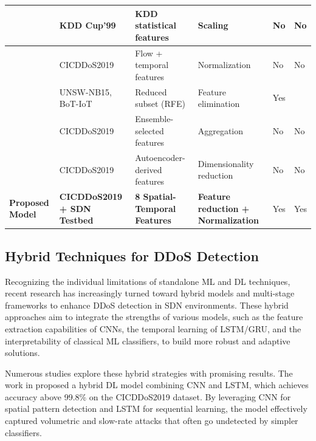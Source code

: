 \documentclass[ASNA,twocolumn]{USG} %
\providecommand{\cmark}{\ding{51}}%
\begin{document}
\begin{table}[htb!]
\begin{tabular}{|p{2.2cm}|p{3.1cm}|p{3.5cm}|p{3.6cm}|p{1cm}|p{1cm}|}
\cite{habib2024time} & KDD Cup’99 & KDD statistical features & Scaling & No & No \\
\hline

\cite{xu2025deep} & CICDDoS2019 & Flow + temporal features & Normalization & No & No \\
\hline

\cite{ain2025securing} & UNSW-NB15, BoT-IoT & Reduced subset (RFE) & Feature elimination & Yes & \cmark \\
\hline

\cite{ma2023real} & CICDDoS2019 & Ensemble-selected features & Aggregation & No & No\\
\hline

\cite{songa2024integrated} & CICDDoS2019 & Autoencoder-derived features & Dimensionality reduction & No & No\\
\hline

\rowcolor{gray!20}
\textbf{Proposed Model} & \textbf{CICDDoS2019 + SDN Testbed} & \textbf{8 Spatial-Temporal Features} & \textbf{Feature reduction + Normalization} & Yes & Yes  \\
\hline

\end{tabular}
\end{table}

\subsection{Hybrid Techniques for DDoS Detection}

Recognizing the individual limitations of standalone ML and DL techniques, recent research has increasingly turned toward hybrid models and multi-stage frameworks to enhance DDoS detection in SDN environments. These hybrid approaches aim to integrate the strengths of various models, such as the feature extraction capabilities of CNNs, the temporal learning of LSTM/GRU, and the interpretability of classical ML classifiers, to build more robust and adaptive solutions.

Numerous studies \cite{polat2022novel, elubeyd2023hybrid, habib2024time, xu2025deep, min2023ddos, nazir2024deep, ain2025securing, ma2023real, shaheed2024hybrid} explore these hybrid strategies with promising results. The work in \cite{elubeyd2023hybrid} proposed a hybrid DL model combining CNN and LSTM, which achieves accuracy above 99.8\% on the CICDDoS2019 dataset. By leveraging CNN for spatial pattern detection and LSTM for sequential learning, the model effectively captured volumetric and slow-rate attacks that often go undetected by simpler classifiers.
\end{document}
